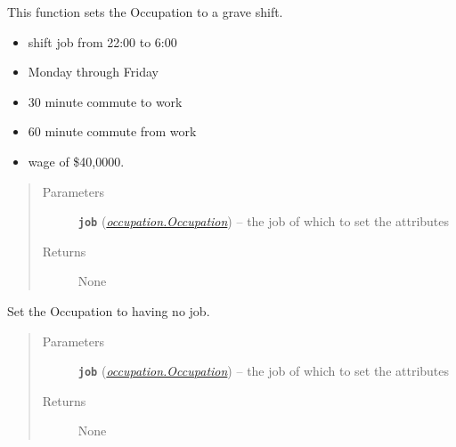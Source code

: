 \documentclass[letterpaper,10pt,english]{sphinxmanual}
\begin{document}
\begin{fulllineitems}
\label{occupation:occupation.set_grave_shift}
This function sets the Occupation to a grave shift.
\begin{itemize}
\item {} 
shift job from  22:00 to 6:00

\item {} 
Monday through Friday

\item {} 
30 minute commute to work

\item {} 
60 minute commute from work

\item {} 
wage of \$40,0000.

\end{itemize}
\begin{quote}\begin{description}
\item[{Parameters}] \leavevmode
\textbf{\texttt{job}} ({\hyperref[occupation:occupation.Occupation]{\emph{\emph{occupation.Occupation}}}}) -- the job of which to set the attributes

\item[{Returns}] \leavevmode
None

\end{description}\end{quote}

\end{fulllineitems}


\begin{fulllineitems}
\label{occupation:occupation.set_no_job}
Set the Occupation to having no job.
\begin{quote}\begin{description}
\item[{Parameters}] \leavevmode
\textbf{\texttt{job}} ({\hyperref[occupation:occupation.Occupation]{\emph{\emph{occupation.Occupation}}}}) -- the job of which to set the attributes

\item[{Returns}] \leavevmode
None

\end{description}\end{quote}

\end{fulllineitems}
\end{document}
